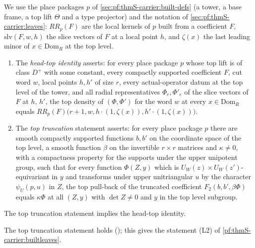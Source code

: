 \begin{definition}\label{pf:sh-curv:htdef}
We use the place packages $p$ of \cref{sec:pf:thmS-carrier:built-defs} (a tower, a base frame, a top lift $\Theta$ and a type
projector) and the notation of \cref{sec:pf:thmS-carrier:leaves}: $RR_p(F)$ are the local kernels of $p$ built from a
coefficient $F$, $\mathrm{slv}(F,w,h)$ the slice vectors of $F$ at a local point $h$, and $\zeta(x)$ the last leading minor of
$x\in\mathrm{Dom}_R$ at the top level.
\begin{enumerate}[label=(\alph*)]
\item The \emph{head-top identity} asserts: for every place package $p$ whose top lift is of class $D^+$ with some constant,
every compactly supported coefficient $F$, cut word $w$, local points $h,h'$ of size $r$, every actual-operator datum at the
top level of the tower, and all radial representatives $\Phi_e,\Phi'_e$ of the slice vectors of $F$ at $h$, $h'$, the top
density of $(\Phi,\Phi')$ for the word $w$ at every $x\in\mathrm{Dom}_R$ equals
$RR_p(F)\bigl(r+1,w,h\cdot(1,\zeta(x)),h'\cdot(1,\zeta(x))\bigr)$.
\item The \emph{top truncation} statement asserts: for every place package $p$ there are smooth compactly supported functions
$b,b'$ on the coordinate space of the top level, a smooth function $\beta$ on the invertible $r\times r$ matrices and
$\kappa\ne0$, with a compactness property for the supports under the upper unipotent group, such that for every function
$\Phi(Z,y)$ which is $U_W(z)\times U_W(z')$-equivariant in $y$ and transforms under upper unitriangular $u$ by the character
$\psi_U(p,u)$ in $Z$, the top pull-back of the truncated coefficient $F_2(b,b',\beta\Phi)$ equals $\kappa\Phi$ at all
$(Z,y)$ with $\det Z\ne0$ and $y$ in the top level subgroup.
\end{enumerate}
\end{definition}

\begin{theorem}\label{pf:sh-curv:headtop}
The top truncation statement implies the head-top identity.
\end{theorem}

The top truncation statement holds (); this gives the
statement (L2) of \cref{pf:thmS-carrier:builtleaves}.

